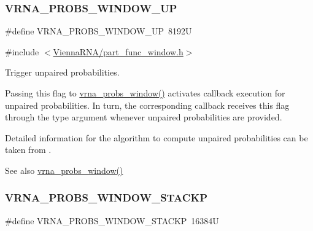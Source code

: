 \subsubsection{\texorpdfstring{V\+R\+N\+A\+\_\+\+P\+R\+O\+B\+S\+\_\+\+W\+I\+N\+D\+O\+W\+\_\+\+UP}{VRNA\_PROBS\_WINDOW\_UP}}
{\footnotesize\ttfamily \#define V\+R\+N\+A\+\_\+\+P\+R\+O\+B\+S\+\_\+\+W\+I\+N\+D\+O\+W\+\_\+\+UP~8192U}



{\ttfamily \#include $<$\hyperlink{part__func__window_8h}{Vienna\+R\+N\+A/part\+\_\+func\+\_\+window.\+h}$>$}



Trigger unpaired probabilities. 

Passing this flag to \hyperlink{group__part__func__window_ga7115d012988541a65ec323c5f17a334b}{vrna\+\_\+probs\+\_\+window()} activates callback execution for unpaired probabilities. In turn, the corresponding callback receives this flag through the {\ttfamily type} argument whenever unpaired probabilities are provided.

Detailed information for the algorithm to compute unpaired probabilities can be taken from \cite{bernhart:2011}.

\begin{DoxySeeAlso}{See also}
\hyperlink{group__part__func__window_ga7115d012988541a65ec323c5f17a334b}{vrna\+\_\+probs\+\_\+window()} 
\end{DoxySeeAlso}
\mbox{\label{group__part__func__window_ga0a13fc668b02f21b225e2334e4caac08}} 
\subsubsection{\texorpdfstring{V\+R\+N\+A\+\_\+\+P\+R\+O\+B\+S\+\_\+\+W\+I\+N\+D\+O\+W\+\_\+\+S\+T\+A\+C\+KP}{VRNA\_PROBS\_WINDOW\_STACKP}}
{\footnotesize\ttfamily \#define V\+R\+N\+A\+\_\+\+P\+R\+O\+B\+S\+\_\+\+W\+I\+N\+D\+O\+W\+\_\+\+S\+T\+A\+C\+KP~16384U}



